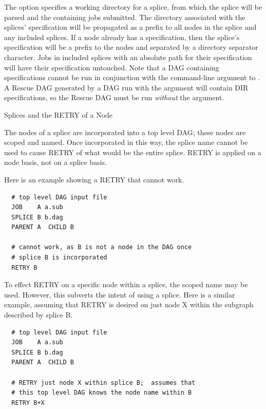 The  option specifies a working directory for a splice,
from which the splice will be parsed and the containing jobs submitted.
The directory associated with the splices'  specification
will be propagated as a prefix to all nodes in the splice and any 
included splices.
If a node already has a  specification, then the splice's
 specification will be a prefix to the nodes and separated by
a directory separator character.
Jobs in included splices with an absolute path for their 
specification will have their  specification untouched.
Note that a DAG containing  specifications cannot be run
in conjunction with the  command-line argument to
.
A Rescue DAG generated by a DAG run with the  argument
will contain DIR specifications, so the Rescue DAG must be run
\emph{without} the  argument.


\begin{description}
\item[Splices and the RETRY of a Node]
\end{description}

The nodes of a splice are incorporated into a top level DAG;
these nodes are scoped and named.
Once incorporated in this way, the splice name cannot be used
to cause RETRY of what would be the entire splice.
RETRY is applied on a node basis, not on a splice basis.

Here is an example showing a RETRY that cannot work.
\begin{verbatim}
  # top level DAG input file
  JOB    A a.sub
  SPLICE B b.dag
  PARENT A  CHILD B

  # cannot work, as B is not a node in the DAG once
  # splice B is incorporated
  RETRY B
\end{verbatim}

To effect RETRY on a specific node within a splice,
the scoped name may be used.
However, this subverts the intent of using a splice.
Here is a similar example, assuming that RETRY is desired
on just node X within the subgraph described by splice B.
\begin{verbatim}
  # top level DAG input file
  JOB    A a.sub
  SPLICE B b.dag
  PARENT A  CHILD B

  # RETRY just node X within splice B;  assumes that
  # this top level DAG knows the node name within B
  RETRY B+X
\end{verbatim}

